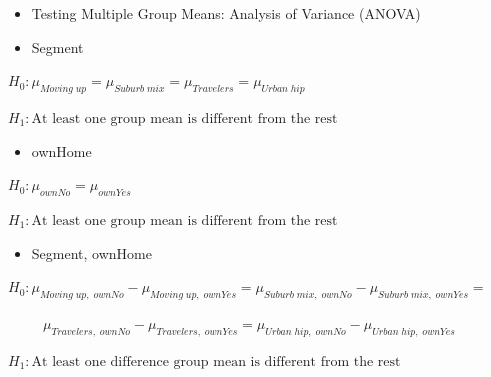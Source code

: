 \documentclass[
  ignorenonframetext,
]{beamer}
\providecommand{\tightlist}{%
  \setlength{\itemsep}{0pt}\setlength{\parskip}{0pt}}\usepackage{longtable,booktabs,array}
\begin{document}
\begin{frame}{}
\label{section-37}
\begin{itemize}
\tightlist
\item
  Testing Multiple Group Means: Analysis of Variance (ANOVA)
\end{itemize}

\footnotesize

\begin{itemize}
\tightlist
\item
  Segment
\end{itemize}

\tiny

\(H_0: \mu_{Moving\;up} = \mu_{Suburb\;mix} = \mu_{Travelers} = \mu_{Urban\;hip}\)

\(H_1: \text{At least one group mean is different from the rest}\)

\footnotesize

\begin{itemize}
\tightlist
\item
  ownHome
\end{itemize}

\tiny

\(H_0: \mu_{ownNo} = \mu_{ownYes}\)

\(H_1: \text{At least one group mean is different from the rest}\)

\footnotesize

\begin{itemize}
\tightlist
\item
  Segment, ownHome
\end{itemize}

\tiny

\(H_0: \mu_{Moving\;up,\;ownNo} - \mu_{Moving\;up,\;ownYes} = \mu_{Suburb\;mix,\;ownNo} - \mu_{Suburb\;mix,\;ownYes} =\)

\(\;\;\;\;\;\;\;\;\;\mu_{Travelers,\;ownNo} - \mu_{Travelers,\;ownYes} = \mu_{Urban\;hip,\;ownNo} - \mu_{Urban\;hip,\;ownYes}\)

\(H_1: \text{At least one difference group mean is different from the rest}\)
\end{frame}
\end{document}
